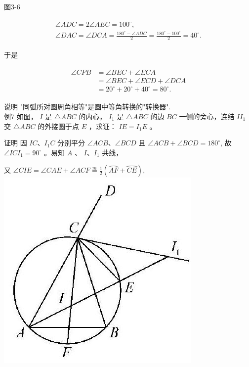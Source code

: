 \documentclass[10pt]{article}
\begin{document}
图3-6

\begin{align*}
\begin{gathered}
\angle A D C=2 \angle A E C=100^{\circ}, \\
\angle D A C=\angle D C A=\frac{180^{\circ}-\angle A D C}{2}=\frac{180^{\circ}-100^{\circ}}{2}=40^{\circ} .
\end{gathered}
\end{align*}

于是

\begin{align*}
\begin{aligned}
\angle C P B & =\angle B E C+\angle E C A \\
& =\angle B E C+\angle E C D+\angle D C A \\
& =20^{\circ}+20^{\circ}+40^{\circ}=80^{\circ} .
\end{aligned}
\end{align*}

说明 "同弧所对圆周角相等"是圆中等角转换的"转换器".\\
例7 如图， $I$ 是 $\triangle A B C$ 的内心， $I_{1}$ 是 $\triangle A B C$ 的边 $B C$ 一侧的旁心，连结 $I I_{1}$ 交 $\triangle A B C$ 的外接圆于点 $E$ ，求证： $I E=I_{1} E$ 。

证明 因 $I C 、 I_{1} C$ 分别平分 $\angle A C B 、 \angle B C D$ 且 $\angle A C B+\angle B C D=180^{\circ}$, 故 $\angle I C I_{1}=90^{\circ}$ 。易知 $A$ 、 $I 、 I_{1}$ 共线，

又 $\angle C I E=\angle C A E+\angle A C F \stackrel{m}{=} \frac{1}{2}(\overparen{A F}+\overparen{C E})$,\\
\includegraphics[max width=\textwidth, center]{2024_10_30_66b8e5e701da2093c133g-025}
\end{document}
